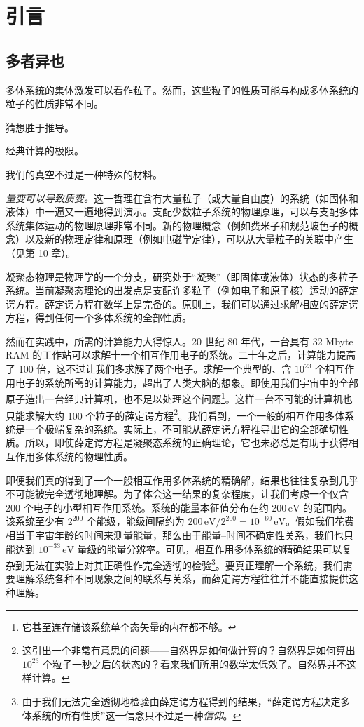 
\chapter{引言}

\section{多者异也}

\begin{keypoints}
\item 多体系统的集体激发可以看作粒子。然而，这些粒子的性质可能与构成多体系统的粒子的性质非常不同。
\item 猜想胜于推导。
\item 经典计算的极限。
\item 我们的真空不过是一种特殊的材料。
\end{keypoints}

\emph{量变可以导致质变。}这一哲理在含有大量粒子（或大量自由度）的系统（如固体和液体）中一遍又一遍地得到演示。支配少数粒子系统的物理原理，可以与支配多体系统集体运动的物理原理非常不同。新的物理概念（例如费米子和规范玻色子的概念）以及新的物理定律和原理（例如电磁学定律），可以从大量粒子的关联中产生（见第 10 章）。

凝聚态物理是物理学的一个分支，研究处于“凝聚”（即固体或液体）状态的多粒子系统。当前凝聚态理论的出发点是支配许多粒子（例如电子和原子核）运动的薛定谔方程。薛定谔方程在数学上是完备的。原则上，我们可以通过求解相应的薛定谔方程，得到任何一个多体系统的全部性质。

然而在实践中，所需的计算能力大得惊人。20 世纪 80 年代，一台具有 32 Mbyte RAM 的工作站可以求解十一个相互作用电子的系统。二十年之后，计算能力提高了 100 倍，这不过让我们多求解了两个电子。求解一个典型的、含 $10^{23}$ 个相互作用电子的系统所需的计算能力，超出了人类大脑的想象。即使用我们宇宙中的全部原子造出一台经典计算机，也不足以处理这个问题\footnote{它甚至连存储该系统单个态矢量的内存都不够。}。这样一台不可能的计算机也只能求解大约 100 个粒子的薛定谔方程\footnote{这引出一个非常有意思的问题——自然界是如何做计算的？自然界是如何算出 $10^{23}$ 个粒子一秒之后的状态的？看来我们所用的数学太低效了。自然界并不这样计算。}。我们看到，一个一般的相互作用多体系统是一个极端复杂的系统。实际上，不可能从薛定谔方程推导出它的全部确切性质。所以，即使薛定谔方程是凝聚态系统的正确理论，它也未必总是有助于获得相互作用多体系统的物理性质。

即便我们真的得到了一个一般相互作用多体系统的精确解，结果也往往复杂到几乎不可能被完全透彻地理解。为了体会这一结果的复杂程度，让我们考虑一个仅含 200 个电子的小型相互作用系统。系统的能量本征值分布在约 $200\,\mathrm{eV}$ 的范围内。该系统至少有 $2^{200}$ 个能级，能级间隔约为 $200\,\mathrm{eV}/2^{200}=10^{-60}\,\mathrm{eV}$。假如我们花费相当于宇宙年龄的时间来测量能量，那么由于能量–时间不确定性关系，我们也只能达到 $10^{-33}\,\mathrm{eV}$ 量级的能量分辨率。可见，相互作用多体系统的精确结果可以复杂到无法在实验上对其正确性作完全透彻的检验\footnote{由于我们无法完全透彻地检验由薛定谔方程得到的结果，“薛定谔方程决定多体系统的所有性质”这一信念只不过是一种\emph{信仰}。}。要真正理解一个系统，我们需要理解系统各种不同现象之间的联系与关系，而薛定谔方程往往并不能直接提供这种理解。

